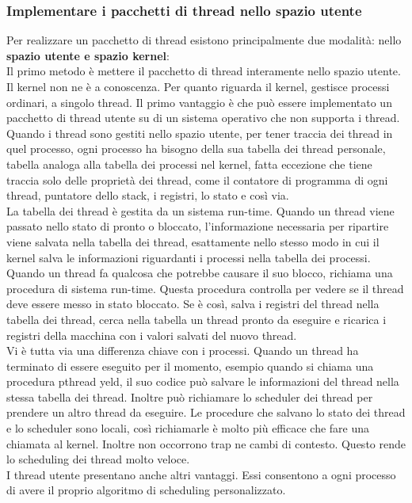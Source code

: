 \documentclass{article}
\begin{document}
\subsubsection{Implementare i pacchetti di thread nello spazio utente}
Per realizzare un pacchetto di thread esistono principalmente due modalità: nello \textbf{spazio utente e spazio kernel}:
\\Il primo metodo è mettere il pacchetto di thread interamente nello spazio utente. Il kernel non ne è a conoscenza. Per quanto riguarda il kernel, gestisce processi ordinari, a singolo thread. Il primo vantaggio è che può essere implementato un pacchetto di thread utente su di un sistema operativo che non supporta i thread.
\\Quando i thread sono gestiti nello spazio utente, per tener traccia dei thread in quel processo, ogni processo ha bisogno della sua tabella dei thread personale, tabella analoga alla tabella dei processi nel kernel, fatta eccezione che tiene traccia solo delle proprietà dei thread, come il contatore di programma di ogni thread, puntatore dello stack, i registri, lo stato e così via.
\\La tabella dei thread è gestita da un sistema run-time. Quando un thread viene passato nello stato di pronto o bloccato, l’informazione necessaria per ripartire viene salvata nella tabella dei thread, esattamente nello stesso modo in cui il kernel salva le informazioni riguardanti i processi nella tabella dei processi.
\\Quando un thread fa qualcosa che potrebbe causare il suo blocco, richiama una procedura di sistema run-time. Questa procedura controlla per vedere se il thread deve essere messo in stato bloccato. Se è così, salva i registri del thread nella tabella dei thread, cerca nella tabella un thread pronto da eseguire e ricarica i registri della macchina con i valori salvati del nuovo thread.
\\Vi è tutta via una differenza chiave con i processi. Quando un thread ha terminato di essere eseguito per il momento, esempio quando si chiama una procedura pthread yeld, il suo codice può salvare le informazioni del thread nella stessa tabella dei thread. Inoltre può richiamare lo scheduler dei thread per prendere un altro thread da eseguire. Le procedure che salvano lo stato dei thread e lo scheduler sono locali, così richiamarle è molto più efficace che fare una chiamata al kernel. Inoltre non occorrono trap ne cambi di contesto. Questo rende lo scheduling dei thread molto veloce.
\\I thread utente presentano anche altri vantaggi. Essi consentono a ogni processo di avere il proprio algoritmo di scheduling personalizzato.
\end{document}
